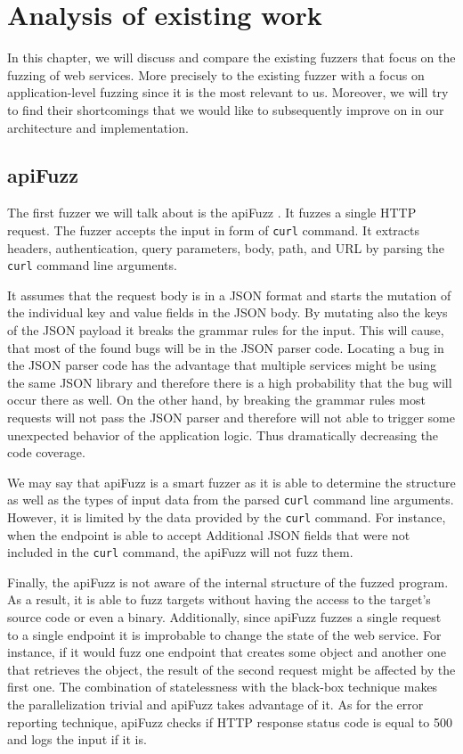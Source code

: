 \chapter{Analysis of existing work}
In this chapter, we will discuss and compare the existing fuzzers that focus on the fuzzing of web services. More precisely to the existing fuzzer with a focus on application-level fuzzing since it is the most relevant to us. \label{sub:Types of fuzzers} Moreover, we will try to find their shortcomings that we would like to subsequently improve on in our architecture and implementation.

\section{apiFuzz}
The first fuzzer we will talk about is the apiFuzz \cite{apiFuzz2020github}. It fuzzes a single HTTP request. The fuzzer accepts the input in form of \texttt{curl} command. It extracts headers, authentication, query parameters, body, path, and URL by parsing the \texttt{curl} command line arguments.

It assumes that the request body is in a JSON format and starts the mutation of the individual key and value fields in the JSON body. By mutating also the keys of the JSON payload it breaks the grammar rules for the input. This will cause, that most of the found bugs will be in the JSON parser code. Locating a bug in the JSON parser code has the advantage that multiple services might be using the same JSON library and therefore there is a high probability that the bug will occur there as well. On the other hand, by breaking the grammar rules most requests will not pass the JSON parser and therefore will not able to trigger some unexpected behavior of the application logic. Thus dramatically decreasing the code coverage.

We may say that apiFuzz is a smart fuzzer as it is able to determine the structure as well as the types of input data from the parsed \texttt{curl} command line arguments. However, it is limited by the data provided by the \texttt{curl} command. For instance, when the endpoint is able to accept Additional JSON fields that were not included in the \texttt{curl} command, the apiFuzz will not fuzz them.

Finally, the apiFuzz is not aware of the internal structure of the fuzzed program. As a result, it is able to fuzz targets without having the access to the target's source code or even a binary. Additionally, since apiFuzz fuzzes a single request to a single endpoint it is improbable to change the state of the web service. For instance, if it would fuzz one endpoint that creates some object and another one that retrieves the object, the result of the second request might be affected by the first one. The combination of statelessness with the black-box technique makes the parallelization trivial and apiFuzz takes advantage of it. As for the error reporting technique, apiFuzz checks if HTTP response status code is equal to 500 and logs the input if it is.

